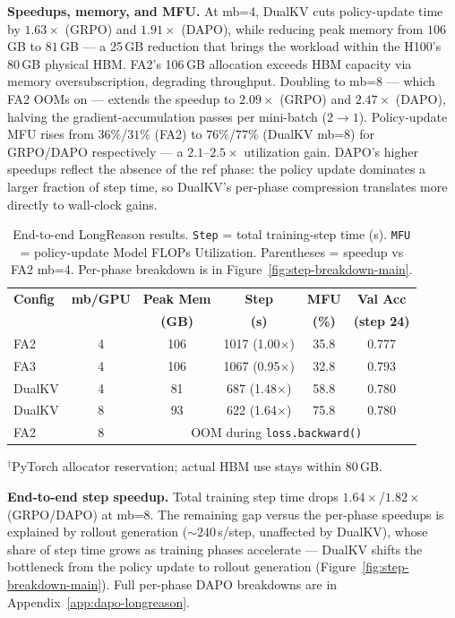 \documentclass{article}
\begin{document}
\textbf{Speedups, memory, and MFU.} At mb=4, DualKV cuts policy-update time by $1.63\times$ (GRPO) and $1.91\times$ (DAPO), while reducing peak memory from $106$\,GB to $81$\,GB --- a 25\,GB reduction that brings the workload within the H100's 80\,GB physical HBM. FA2's 106\,GB allocation exceeds HBM capacity via memory oversubscription, degrading throughput. Doubling to mb=8 --- which FA2 OOMs on --- extends the speedup to $2.09\times$ (GRPO) and $2.47\times$ (DAPO), halving the gradient-accumulation passes per mini-batch ($2 \to 1$). Policy-update MFU rises from $36\%$/$31\%$ (FA2) to $76\%$/$77\%$ (DualKV mb=8) for GRPO/DAPO respectively --- a $2.1$--$2.5\times$ utilization gain. DAPO's higher speedups reflect the absence of the ref phase: the policy update dominates a larger fraction of step time, so DualKV's per-phase compression translates more directly to wall-clock gains.



\begin{table}
\centering
\scriptsize
\setlength{\tabcolsep}{3pt}
\caption{End-to-end LongReason results. \texttt{Step} = total training-step time (s). \texttt{MFU} = policy-update Model FLOPs Utilization. Parentheses = speedup vs FA2 mb=4. Per-phase breakdown is in Figure~\ref{fig:step-breakdown-main}.}
\label{tab:e2e-longreason}
\begin{tabular}{@{}lc c c c c@{}}
\toprule
\textbf{Config} & \textbf{mb/GPU} & \textbf{Peak Mem} & \textbf{Step} & \textbf{MFU} & \textbf{Val Acc} \\
 & & \textbf{(GB)} & \textbf{(s)} & \textbf{(\%)} & \textbf{(step 24)} \\
\midrule
FA2      & 4 & 106\rlap{$^\dagger$} & 1017 (1.00$\times$) & 35.8 & 0.777 \\
FA3      & 4 & 106\rlap{$^\dagger$} & 1067 (0.95$\times$) & 32.8 & 0.793 \\
DualKV   & 4 & 81                  &  687 (1.48$\times$) & 58.8 & 0.780 \\
DualKV   & 8 & 93                  &  622 (1.64$\times$) & 75.8 & 0.780 \\
FA2      & 8 & \multicolumn{4}{c}{OOM during \texttt{loss.backward()}} \\
\bottomrule
\end{tabular}
\vspace{2pt}

{\scriptsize $^\dagger$PyTorch allocator reservation; actual HBM use stays within 80\,GB.}
\end{table}
\textbf{End-to-end step speedup.} Total training step time drops $1.64\times$/$1.82\times$ (GRPO/DAPO) at mb=8. The remaining gap versus the per-phase speedups is explained by rollout generation (${\sim}240$\,s/step, unaffected by DualKV), whose share of step time grows as training phases accelerate --- DualKV shifts the bottleneck from the policy update to rollout generation (Figure~\ref{fig:step-breakdown-main}). Full per-phase DAPO breakdowns are in Appendix~\ref{app:dapo-longreason}.
\end{document}
